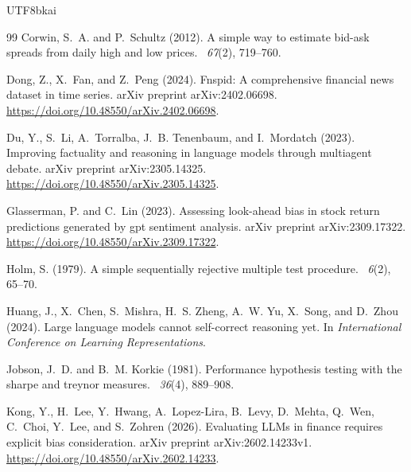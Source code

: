 \documentclass[12pt,a4paper]{article}
\begin{document}
\begin{CJK}{UTF8}{bkai}
\begin{thebibliography}{99}
Corwin, S.~A. and P.~Schultz (2012).
\newblock A simple way to estimate bid-ask spreads from daily high and low
  prices.
~{\em 67\/}(2), 719--760.

Dong, Z., X.~Fan, and Z.~Peng (2024).
\newblock Fnspid: A comprehensive financial news dataset in time series.
\newblock arXiv preprint arXiv:2402.06698.
\newblock \url{https://doi.org/10.48550/arXiv.2402.06698}.

Du, Y., S.~Li, A.~Torralba, J.~B. Tenenbaum, and I.~Mordatch (2023).
\newblock Improving factuality and reasoning in language models through
  multiagent debate.
\newblock arXiv preprint arXiv:2305.14325.
\newblock \url{https://doi.org/10.48550/arXiv.2305.14325}.

Glasserman, P. and C.~Lin (2023).
\newblock Assessing look-ahead bias in stock return predictions generated by
  gpt sentiment analysis.
\newblock arXiv preprint arXiv:2309.17322.
\newblock \url{https://doi.org/10.48550/arXiv.2309.17322}.

Holm, S. (1979).
\newblock A simple sequentially rejective multiple test procedure.
~{\em 6\/}(2), 65--70.

Huang, J., X.~Chen, S.~Mishra, H.~S. Zheng, A.~W. Yu, X.~Song, and D.~Zhou
  (2024).
\newblock Large language models cannot self-correct reasoning yet.
\newblock In {\em International Conference on Learning Representations}.

Jobson, J.~D. and B.~M. Korkie (1981).
\newblock Performance hypothesis testing with the sharpe and treynor measures.
~{\em 36\/}(4), 889--908.

Kong, Y., H.~Lee, Y.~Hwang, A.~Lopez-Lira, B.~Levy, D.~Mehta, Q.~Wen, C.~Choi,
  Y.~Lee, and S.~Zohren (2026).
\newblock Evaluating {LLMs} in finance requires explicit bias consideration.
\newblock arXiv preprint arXiv:2602.14233v1.
\newblock \url{https://doi.org/10.48550/arXiv.2602.14233}.


\end{thebibliography}
\end{CJK}
\end{document}
